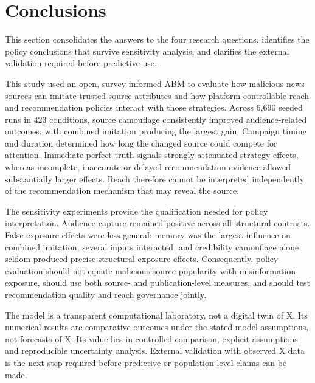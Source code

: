 \section{Conclusions}

This section consolidates the answers to the four research questions, identifies the policy conclusions that survive sensitivity analysis, and clarifies the external validation required before predictive use.

This study used an open, survey-informed ABM to evaluate how malicious news sources can imitate trusted-source attributes and how platform-controllable reach and recommendation policies interact with those strategies. Across 6,690 seeded runs in 423 conditions, source camouflage consistently improved audience-related outcomes, with combined imitation producing the largest gain. Campaign timing and duration determined how long the changed source could compete for attention. Immediate perfect truth signals strongly attenuated strategy effects, whereas incomplete, inaccurate or delayed recommendation evidence allowed substantially larger effects. Reach therefore cannot be interpreted independently of the recommendation mechanism that may reveal the source.

The sensitivity experiments provide the qualification needed for policy interpretation. Audience capture remained positive across all structural contrasts. False-exposure effects were less general: memory was the largest influence on combined imitation, several inputs interacted, and credibility camouflage alone seldom produced precise structural exposure effects. Consequently, policy evaluation should not equate malicious-source popularity with misinformation exposure, should use both source- and publication-level measures, and should test recommendation quality and reach governance jointly.

The model is a transparent computational laboratory, not a digital twin of X. Its numerical results are comparative outcomes under the stated model assumptions, not forecasts of X. Its value lies in controlled comparison, explicit assumptions and reproducible uncertainty analysis. External validation with observed X data is the next step required before predictive or population-level claims can be made.
